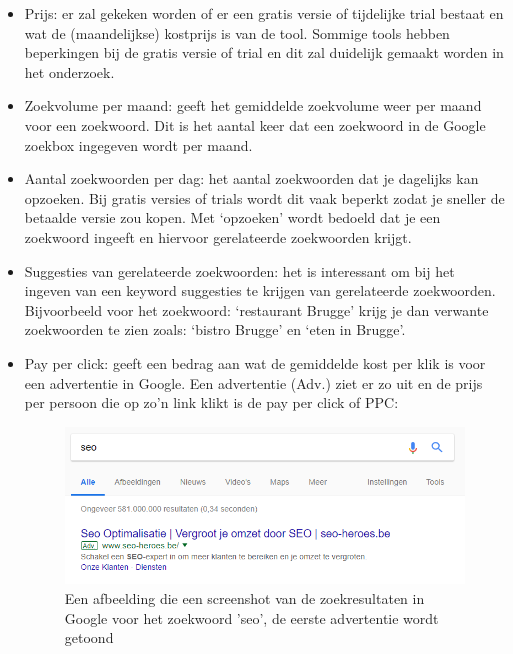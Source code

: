 \begin{itemize}
\item Prijs: er zal gekeken worden of er een gratis versie of tijdelijke trial bestaat en wat de (maandelijkse) kostprijs is van de tool. Sommige tools hebben beperkingen bij de gratis versie of trial en dit zal duidelijk gemaakt worden in het onderzoek. 
\item Zoekvolume per maand: geeft het gemiddelde zoekvolume weer per maand voor een zoekwoord. Dit is het aantal keer dat een zoekwoord in de Google zoekbox ingegeven wordt per maand.
\item Aantal zoekwoorden per dag: het aantal zoekwoorden dat je dagelijks kan opzoeken. Bij gratis versies of trials wordt dit vaak beperkt zodat je sneller de betaalde versie zou kopen. Met ‘opzoeken’ wordt bedoeld dat je een zoekwoord ingeeft en hiervoor gerelateerde zoekwoorden krijgt.
\item Suggesties van gerelateerde zoekwoorden: het is interessant om bij het ingeven van een keyword suggesties te krijgen van gerelateerde zoekwoorden. Bijvoorbeeld voor het zoekwoord: ‘restaurant Brugge’ krijg je dan verwante zoekwoorden te zien zoals: ‘bistro Brugge’ en ‘eten in Brugge’.
\item Pay per click: geeft een bedrag aan wat de gemiddelde kost per klik is voor een advertentie in Google. Een advertentie (Adv.) ziet er zo uit en de prijs per persoon die op zo’n link klikt is de pay per click of PPC: 

\begin{figure}[h!]
\centering
\includegraphics[width=\linewidth]{Bachelorproef/bachelor/img/Adwordsvoorbeeld.png}
\caption{Een afbeelding die een screenshot van de zoekresultaten in Google voor het zoekwoord 'seo', de eerste advertentie wordt getoond \autocite{google.be}}
\end{figure}


\end{itemize}
